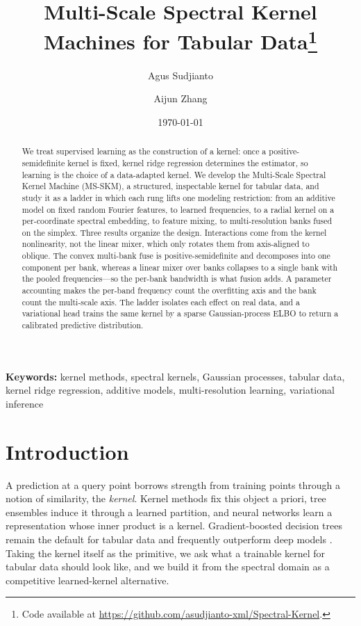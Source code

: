 \documentclass[11pt]{article}
\title{\textbf{Multi-Scale Spectral Kernel Machines for Tabular Data}\thanks{Code available at
\url{https://github.com/asudjianto-xml/Spectral-Kernel}.}}
\author{Agus Sudjianto \and Aijun Zhang}
\date{\today}
\theoremstyle{definition}
\begin{document}
\maketitle

\begin{abstract}
We treat supervised learning as the construction of a kernel: once a positive-semidefinite
kernel is fixed, kernel ridge regression determines the estimator, so learning is the choice
of a data-adapted kernel. We develop the Multi-Scale Spectral Kernel Machine (MS-SKM), a
structured, inspectable kernel for tabular data, and study it as a ladder in which each rung
lifts one modeling restriction: from an additive model on fixed random Fourier features, to
learned frequencies, to a radial kernel on a per-coordinate spectral embedding, to feature
mixing, to multi-resolution banks fused on the simplex. Three results organize the design.
Interactions come from the kernel nonlinearity, not the linear mixer, which only rotates them
from axis-aligned to oblique. The convex multi-bank fuse is positive-semidefinite and
decomposes into one component per bank, whereas a linear mixer over banks collapses to a single
bank with the pooled frequencies---so the per-bank bandwidth is what fusion adds. A parameter
accounting makes the per-band frequency count the overfitting axis and the bank count the
multi-scale axis. The ladder isolates each effect on real data, and a variational head trains
the same kernel by a sparse Gaussian-process ELBO to return a calibrated predictive
distribution.
\end{abstract}

\vskip 0.1in
\noindent\textbf{Keywords:} kernel methods, spectral kernels, Gaussian processes, tabular data,
kernel ridge regression, additive models, multi-resolution learning, variational inference

\section{Introduction}
A prediction at a query point borrows strength from training points through a notion of
similarity, the \emph{kernel}. Kernel methods fix this object a priori, tree ensembles induce
it through a learned partition, and neural networks learn a representation whose inner product
is a kernel. Gradient-boosted decision trees remain the default for tabular data and frequently
outperform deep models \citep{chen2016xgboost,ke2017lightgbm,prokhorenkova2018catboost,grinsztajn2022}.
Taking the kernel itself as the primitive, we ask what a trainable kernel for tabular data
should look like, and we build it from the spectral domain as a competitive learned-kernel
alternative.
\end{document}
